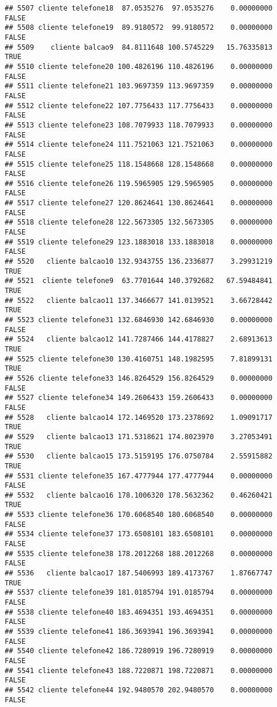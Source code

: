 \documentclass[
]{article}
\begin{document}
\begin{verbatim}
## 5507 cliente telefone18  87.0535276  97.0535276    0.00000000    FALSE
## 5508 cliente telefone19  89.9180572  99.9180572    0.00000000    FALSE
## 5509    cliente balcao9  84.8111648 100.5745229   15.76335813     TRUE
## 5510 cliente telefone20 100.4826196 110.4826196    0.00000000    FALSE
## 5511 cliente telefone21 103.9697359 113.9697359    0.00000000    FALSE
## 5512 cliente telefone22 107.7756433 117.7756433    0.00000000    FALSE
## 5513 cliente telefone23 108.7079933 118.7079933    0.00000000    FALSE
## 5514 cliente telefone24 111.7521063 121.7521063    0.00000000    FALSE
## 5515 cliente telefone25 118.1548668 128.1548668    0.00000000    FALSE
## 5516 cliente telefone26 119.5965905 129.5965905    0.00000000    FALSE
## 5517 cliente telefone27 120.8624641 130.8624641    0.00000000    FALSE
## 5518 cliente telefone28 122.5673305 132.5673305    0.00000000    FALSE
## 5519 cliente telefone29 123.1883018 133.1883018    0.00000000    FALSE
## 5520   cliente balcao10 132.9343755 136.2336877    3.29931219     TRUE
## 5521  cliente telefone9  63.7701644 140.3792682   67.59484841     TRUE
## 5522   cliente balcao11 137.3466677 141.0139521    3.66728442     TRUE
## 5523 cliente telefone31 132.6846930 142.6846930    0.00000000    FALSE
## 5524   cliente balcao12 141.7287466 144.4178827    2.68913613     TRUE
## 5525 cliente telefone30 130.4160751 148.1982595    7.81899131     TRUE
## 5526 cliente telefone33 146.8264529 156.8264529    0.00000000    FALSE
## 5527 cliente telefone34 149.2606433 159.2606433    0.00000000    FALSE
## 5528   cliente balcao14 172.1469520 173.2378692    1.09091717     TRUE
## 5529   cliente balcao13 171.5318621 174.8023970    3.27053491     TRUE
## 5530   cliente balcao15 173.5159195 176.0750784    2.55915882     TRUE
## 5531 cliente telefone35 167.4777944 177.4777944    0.00000000    FALSE
## 5532   cliente balcao16 178.1006320 178.5632362    0.46260421     TRUE
## 5533 cliente telefone36 170.6068540 180.6068540    0.00000000    FALSE
## 5534 cliente telefone37 173.6508101 183.6508101    0.00000000    FALSE
## 5535 cliente telefone38 178.2012268 188.2012268    0.00000000    FALSE
## 5536   cliente balcao17 187.5406993 189.4173767    1.87667747     TRUE
## 5537 cliente telefone39 181.0185794 191.0185794    0.00000000    FALSE
## 5538 cliente telefone40 183.4694351 193.4694351    0.00000000    FALSE
## 5539 cliente telefone41 186.3693941 196.3693941    0.00000000    FALSE
## 5540 cliente telefone42 186.7280919 196.7280919    0.00000000    FALSE
## 5541 cliente telefone43 188.7220871 198.7220871    0.00000000    FALSE
## 5542 cliente telefone44 192.9480570 202.9480570    0.00000000    FALSE

\end{verbatim}
\end{document}
